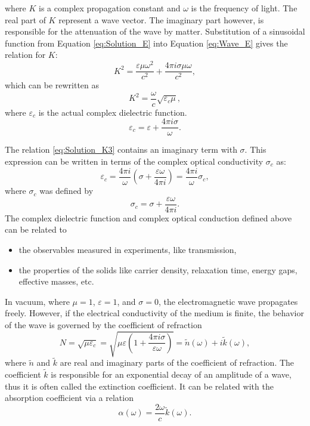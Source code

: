 \documentclass[titlepage,a4paper]{book}
\begin{document}
where $K$ is a complex propagation constant and $\omega$ is the frequency of light. The real part of $K$ represent a wave vector. The imaginary part however, is responsible for the attenuation of the wave by matter. Substitution of a sinusoidal function from Equation \ref{eq:Solution_E} into Equation \ref{eq:Wave_E} gives the relation for $K$:
\begin{equation}
\label{eq:Solution_K}
K^2 = \frac{\varepsilon \mu \omega^2}{c^2}  + \frac{4\pi i \sigma \mu \omega}{c^2},
\end{equation}
which can be rewritten as
\begin{equation}
\label{eq:Solution_K2}
K^2 = \frac{\omega}{c} \sqrt{\varepsilon_c \mu},
\end{equation}
where $\varepsilon_c$ is the actual complex dielectric function.
\begin{equation}
\label{eq:Solution_K3}
\varepsilon_c = \varepsilon + \frac{4\pi i \sigma}{\omega}.
\end{equation}

The relation \ref{eq:Solution_K3} contains an imaginary term with $\sigma$. This expression can be written in terms of the complex optical conductivity $\sigma_c$ as:
\begin{equation}
\label{eq:Solution_K4}
\varepsilon_c = \frac{4\pi i}{\omega}\left( \sigma + \frac{\varepsilon \omega}{4\pi i} \right) = \frac{4\pi i}{\omega} \sigma_c,
\end{equation}
where $\sigma_c$ was defined by
\begin{equation}
\label{eq:Solution_K5}
\sigma_c = \sigma + \frac{\varepsilon \omega}{4\pi i}.
\end{equation}
The complex dielectric function and complex optical conduction defined above can be related to 
\begin{itemize}
\item the observables measured in experiments, like transmission,
\item the properties of the solids like carrier density, relaxation time, energy gaps, effective masses, etc.
\end{itemize}

In vacuum, where $\mu = 1$, $\varepsilon = 1$, and $\sigma = 0$, the electromagnetic wave propagates freely. However, if the electrical conductivity of the medium is finite, the behavior of the wave is governed by the coefficient of refraction
\begin{equation}
\label{eq:Solution_K6}
N = \sqrt{\mu\varepsilon_c} = \sqrt{\mu\varepsilon \left(1 + \frac{4\pi i \sigma}{\varepsilon \omega} \right)} = \tilde{n}(\omega) + i\tilde{k}(\omega),
\end{equation}
where $\tilde{n}$ and $\tilde{k}$ are real and imaginary parts of the coefficient of refraction. The coefficient $\tilde{k}$ is responsible for an exponential decay of an amplitude of a wave, thus it is often called the extinction coefficient. It can be related with the absorption coefficient via a relation
\begin{equation}
\label{eq:Solution_K7}
\alpha (\omega) = \frac{2\omega}{c} \tilde{k}(\omega).
\end{equation}
\end{document}
